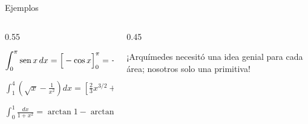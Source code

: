 \documentclass[10pt,aspectratio=169]{beamer}
\begin{document}
\begin{frame}{Ejemplos}
  \begin{columns}
    \begin{column}{0.55\textwidth}
      \begin{ejemplo}[1]
        $\displaystyle\int_0^\pi\operatorname{sen} x\,dx=\Big[-\cos x\Big]_0^\pi=-(-1)-(-1)=2.$
      \end{ejemplo}
      \begin{ejemplo}[2]
        $\displaystyle\int_1^4\left(\sqrt x-\frac1{x^2}\right)dx=\left[\tfrac23x^{3/2}+\tfrac1x\right]_1^4=\frac{14}{3}-\frac34=\frac{47}{12}.$
      \end{ejemplo}
      \begin{ejemplo}[3]
        $\displaystyle\int_0^1\frac{dx}{1+x^2}=\arctan1-\arctan0=\frac\pi4.$
      \end{ejemplo}
    \end{column}
    \begin{column}{0.45\textwidth}
      \centering

      \small ¡Arquímedes necesitó una idea genial para cada área; nosotros solo una primitiva!
    \end{column}
  \end{columns}
\end{frame}
\end{document}
